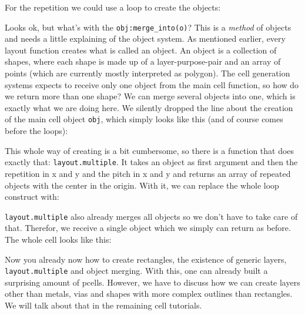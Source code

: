 For the repetition we could use a loop to create the objects:

Looks ok, but what's with the \lstinline!obj:merge_into(o)!? This is a \emph{method} of objects and needs a little explaining of the object system. As mentioned
earlier, every layout function creates what is called an object. An object is a collection of shapes, where each shape is made up of a layer-purpose-pair and an
array of points (which are currently mostly interpreted as polygon). The cell generation systems expects to receive only one object from the main cell function, so
how do we return more than one shape? We can merge several objects into one, which is exactly what we are doing here. We silently dropped the line about the creation
of the main cell object \lstinline!obj!, which simply looks like this (and of course comes before the loops):

This whole way of creating is a bit cumbersome, so there is a function that does exactly that: \lstinline!layout.multiple!. It takes an object as first argument and
then the repetition in x and y and the pitch in x and y and returns an array of repeated objects with the center in the origin. With it, we can replace the whole
loop construct with:

\lstinline!layout.multiple! also already merges all objects so we don't have to take care of that. Therefor, we receive a single object which we simply can return as
before. The whole cell looks like this:

Now you already now how to create rectangles, the existence of generic layers, \lstinline!layout.multiple! and object merging. With this, one can already built a
surprising amount of pcells. However, we have to discuss how we can create layers other than metals, vias and shapes with more complex outlines than rectangles. We
will talk about that in the remaining cell tutorials.

